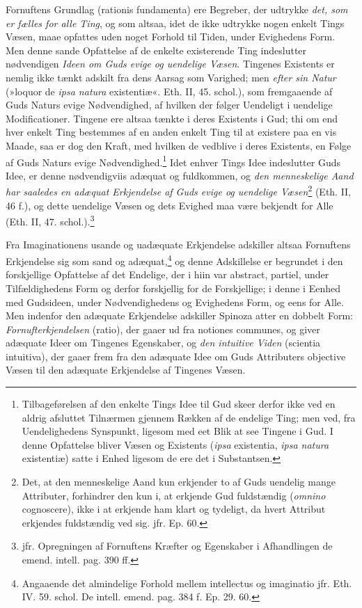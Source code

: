\documentclass[12pt,a4paper]{book}
\newcommand{\opage}[1]{\marginnote{\footnotesize\textit{[#1]}}}
\begin{document}
Fornuftens Grundlag (rationis fundamenta) ere Begreber, der
udtrykke \emph{det, som er fælles for alle Ting}, og som altsaa, idet
de ikke udtrykke nogen enkelt Tings Væsen, maae opfattes uden
noget Forhold til Tiden, under Evighedens Form. Men denne
sande Opfattelse af de enkelte existerende Ting indeslutter
nødvendigen \emph{Ideen om Guds evige og uendelige Væsen}. Tingenes
Existents er
\opage{94} \setcounter{footnote}{0}%
nemlig ikke tænkt adskilt fra dens Aarsag som Varighed; men
\emph{efter sin Natur} (»loquor de \emph{ipsa natura} existentiæ«. Eth. II,
45. schol.), som fremgaaende af Guds Naturs evige
Nødvendighed, af hvilken der følger Uendeligt i uendelige
Modificationer. Tingene ere altsaa tænkte i deres Existents i
Gud; thi om end hver enkelt Ting bestemmes af en anden enkelt
Ting til at existere paa en vis Maade, saa er dog den Kraft,
med hvilken de vedblive i deres Existents, en Følge af Guds
Naturs evige Nødvendighed.\footnote{Tilbageførelsen af den
enkelte Tings Idee til Gud skeer derfor ikke ved en aldrig
afsluttet Tilnærmen gjennem Rækken af de endelige Ting; men
ved, fra Uendelighedens Synspunkt, ligesom med eet Blik at see
Tingene i Gud. I denne Opfattelse bliver Væsen og Existents
(\emph{ipsa} existentia, \emph{ipsa natura} existentiæ) satte i
Enhed ligesom de ere det i Substantsen.} Idet enhver Tings
Idee indeslutter Guds Idee, er denne nødvendigviis adæquat og
fuldkommen, og \emph{den menneskelige Aand har saaledes en
adæquat Erkjendelse af Guds evige og uendelige
Væsen}\footnote{Det, at den menneskelige Aand kun erkjender to
af Guds uendelig mange Attributer, forhindrer den kun i, at
erkjende Gud fuldstændig (\emph{omnino} cognoscere), ikke i at
erkjende ham klart og tydeligt, da hvert Attribut erkjendes
fuldstændig ved sig. jfr. Ep. 60.} (Eth. II, 46 f.), og dette
uendelige Væsen og dets Evighed maa være bekjendt for Alle
(Eth. II, 47. schol.).\footnote{jfr. Opregningen af Fornuftens
Kræfter og Egenskaber i Afhandlingen de emend. intell. pag.
390 ff.}

Fra Imaginationens usande og uadæquate Erkjendelse adskiller
altsaa Fornuftens Erkjendelse sig som sand og
adæquat,\footnote{Angaaende det almindelige Forhold mellem
intellectus og imaginatio jfr. Eth. IV. 59. schol. De intell.
emend. pag. 384 f. Ep. 29. 60.} og denne Adskillelse er
begrundet i den forskjellige Opfattelse af det Endelige, der i
hiin var abstract, partiel, under Tilfældighedens Form og
derfor forskjellig for de Forskjellige; i denne i Eenhed med
Gudsideen, under Nødvendighedens og Evighedens Form, og eens
for Alle. Men indenfor den adæquate Erkjendelse adskiller
Spinoza atter en dobbelt Form: \emph{Fornufterkjendelsen}
(ratio), der
\opage{95} \setcounter{footnote}{0}%
gaaer ud fra notiones communes, og giver adæquate Ideer om
Tingenes Egenskaber, og \emph{den intuitive Viden}
(scientia intuitiva), der gaaer frem fra den adæquate Idee om
Guds Attributers objective Væsen til den adæquate Erkjendelse af
Tingenes Væsen.
\end{document}
